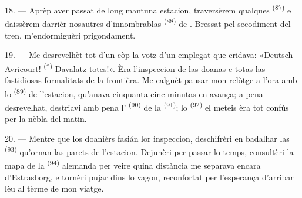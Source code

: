 18. --- Aprèp aver passat de long mantuna estacion, traversèrem qualques
 \textsuperscript{(87)} e daissèrem darrièr nosautres
d'innombrablas  \textsuperscript{(88)} de
. Bressat pel secodiment del tren, m'endormiguèri
prigondament.

\VUsaut{3.0mm}
\VUsaut{3.0mm}

19. --- Me desrevelhèt tot d'un còp la votz d'un emplegat que cridava:
«Deutsch-Avricourt! \textsuperscript{(*)} Davalatz totes!». Èra l'inspeccion de
las doanas e totas las fastidiosas formalitats de la frontièra. Me calguèt pausar
mon relòtge a l'ora amb lo  \textsuperscript{(89)} de l'estacion,
qu'anava cinquanta-cinc minutas en avança; a pena desrevelhat, destriavi amb pena
l' \textsuperscript{(90)} de la 
\textsuperscript{(91)}; lo  \textsuperscript{(92)} el meteis èra
tot confús per la nèbla del matin.

20. --- Mentre que los doanièrs fasián lor inspeccion, deschifrèri en badalhar
las  \textsuperscript{(93)} qu'ornan las parets de l'estacion.
Dejunèri per passar lo temps, consultèri la mapa de la 
\textsuperscript{(94)} alemanda per veire quina distància me separava encara
d'Estrasborg, e tornèri pujar dins lo vagon, reconfortat per l'esperança
d'arribar lèu al tèrme de mon viatge.
\VUsaut{6.0mm}
\VUfilet{22mm}
